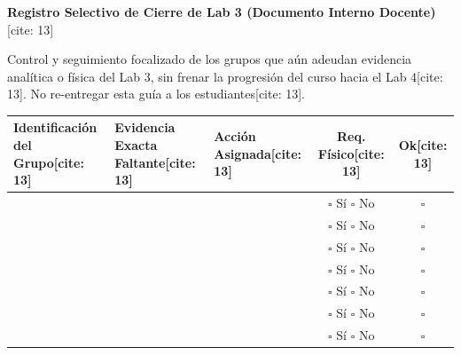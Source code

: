 \documentclass[11pt, a4paper]{article}
\begin{document}
\begin{center}
    \Large\textbf{\textcolor{ucbblue}{Registro Selectivo de Cierre de Lab 3 (Documento Interno Docente)}}[cite: 13]
\end{center}

\begin{tcolorbox}[colback=white, colframe=black, title=\textbf{Objetivo Administrativo}]
    Control y seguimiento focalizado de los grupos que aún adeudan evidencia analítica o física del Lab 3, sin frenar la progresión del curso hacia el Lab 4[cite: 13]. No re-entregar esta guía a los estudiantes[cite: 13].
\end{tcolorbox}

\begin{table}[h!]
    \centering
    \renewcommand{\arraystretch}{1.5}
    \footnotesize
    \begin{tabularx}{\textwidth}{|>{\raggedright\arraybackslash\hsize=0.8\hsize}X|>{\raggedright\arraybackslash\hsize=1.2\hsize}X|>{\raggedright\arraybackslash\hsize=1.0\hsize}X|c|c|}
    \hline
    \rowcolor[HTML]{EFEFEF} 
    \textbf{Identificación del Grupo[cite: 13]} & \textbf{Evidencia Exacta Faltante[cite: 13]} & \textbf{Acción Asignada[cite: 13]} & \textbf{Req. Físico[cite: 13]} & \textbf{Ok[cite: 13]} \\ \hline
    & & & $\square$ Sí \quad $\square$ No & $\square$ \\ \hline
    & & & $\square$ Sí \quad $\square$ No & $\square$ \\ \hline
    & & & $\square$ Sí \quad $\square$ No & $\square$ \\ \hline
    & & & $\square$ Sí \quad $\square$ No & $\square$ \\ \hline
    & & & $\square$ Sí \quad $\square$ No & $\square$ \\ \hline
    & & & $\square$ Sí \quad $\square$ No & $\square$ \\ \hline
    & & & $\square$ Sí \quad $\square$ No & $\square$ \\ \hline
    \end{tabularx}
\end{table}
\end{document}
